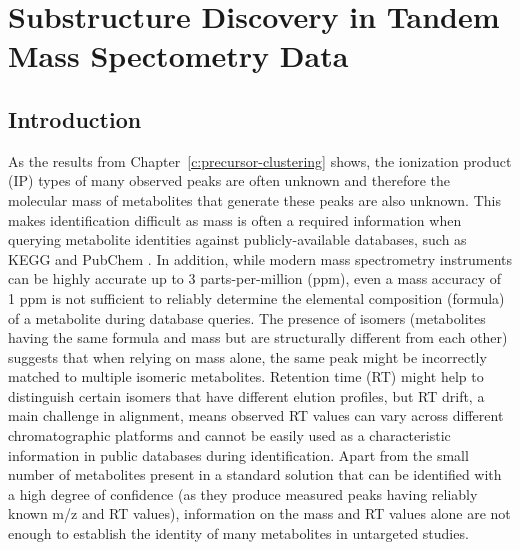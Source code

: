 \chapter{Substructure Discovery in Tandem Mass Spectometry Data}
\label{c:background}

\section{Introduction}

As the results from Chapter~\ref{c:precursor-clustering} shows, the ionization product (IP) types of many observed peaks are often unknown and therefore the molecular mass of metabolites that generate these peaks are also unknown. This makes identification difficult as mass is often a required information when querying metabolite identities against publicly-available databases, such as KEGG \cite{kotera2012kegg} and PubChem \cite{bolton2008pubchem}. In addition, while modern mass spectrometry instruments can be highly accurate up to 3 parts-per-million (ppm), even a mass accuracy of 1 ppm is not sufficient to reliably determine the elemental composition (formula) of a metabolite \cite{Kind2007} during database queries. The presence of isomers (metabolites having the same formula and mass but are structurally different from each other) suggests that when relying on mass alone, the same peak might be incorrectly matched to multiple isomeric metabolites. Retention time (RT) might help to distinguish certain isomers that have different elution profiles, but RT drift, a main challenge in alignment, means observed RT values can vary across different chromatographic platforms and cannot be easily used as a characteristic information in public databases during identification. Apart from the small number of metabolites present in a standard solution that can be identified with a high degree of confidence (as they produce measured peaks having reliably known m/z and RT values), information on the mass and RT values alone are not enough to establish the identity of many metabolites in untargeted studies. 

